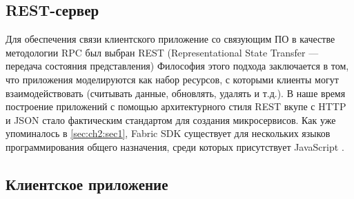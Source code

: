 \subsection{REST-сервер} \label{subsec:ch2/sec2/subsec3}
Для обеспечения связи клиентского приложение со связующим ПО в качестве методологии RPC был выбран REST (Representational State Transfer — передача состояния представления)\cite{restful} Философия этого подхода заключается в том, что приложения моделируются как набор ресурсов, с которыми клиенты могут взаимодействовать (считывать данные, обновлять, удалять и т.д.). В наше время построение приложений с помощью архитектурного стиля REST вкупе с HTTP и JSON \cite{js-json} стало фактическим стандартом для создания микросервисов.
Как уже упоминалось в \ref{sec:ch2:sec1}, Fabric SDK существует для нескольких языков программирования общего назначения, среди которых присутствует JavaScript \cite{pure-js}. 

\subsection{Клиентское приложение}
 \label{subsec:ch2/sec2/subsec3}
 
